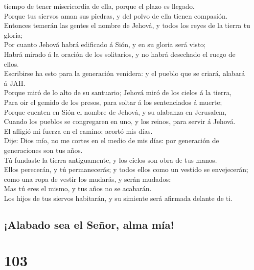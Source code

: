 tiempo de tener misericordia de ella, porque el plazo es llegado.\\
 Porque tus siervos aman sus piedras, y del polvo de ella
tienen compasión.\\
 Entonces temerán las gentes el nombre de Jehová, y todos
los reyes de la tierra tu gloria;\\
 Por cuanto Jehová habrá edificado á Sión, y en su gloria
será visto;\\
 Habrá mirado á la oración de los solitarios, y no habrá
desechado el ruego de ellos.\\
 Escribirse ha esto para la generación venidera: y el
pueblo que se criará, alabará á JAH.\\
 Porque miró de lo alto de su santuario; Jehová miró de los
cielos á la tierra,\\
 Para oir el gemido de los presos, para soltar á los
sentenciados á muerte;\\
 Porque cuenten en Sión el nombre de Jehová, y su alabanza
en Jerusalem,\\
 Cuando los pueblos se congregaren en uno, y los reinos,
para servir á Jehová.\\
 El afligió mi fuerza en el camino; acortó mis días.\\
 Dije: Dios mío, no me cortes en el medio de mis días: por
generación de generaciones son tus años.\\
 Tú fundaste la tierra antiguamente, y los cielos son obra
de tus manos.\\
 Ellos perecerán, y tú permanecerás; y todos ellos como un
vestido se envejecerán; como una ropa de vestir los mudarás, y serán
mudados:\\
 Mas tú eres el mismo, y tus años no se acabarán.\\
 Los hijos de tus siervos habitarán, y su simiente será
afirmada delante de ti.

\hypertarget{alabado-sea-el-seuxf1or-alma-muxeda}{%
\subsection{¡Alabado sea el Señor, alma
mía!}\label{alabado-sea-el-seuxf1or-alma-muxeda}}

\hypertarget{section-102}{%
\section{103}\label{section-102}}

